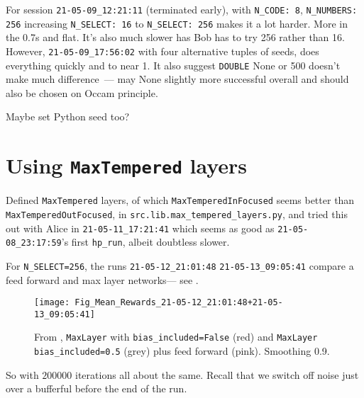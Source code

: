 \documentclass[12pt]{article}
\begin{document}
For session \verb|21-05-09_12:21:11| (terminated early), with \verb|N_CODE: 8|, \verb|N_NUMBERS: 256| increasing \verb|N_SELECT: 16| to \verb|N_SELECT: 256| makes it a lot harder. More in the 0.7s and flat. It's also much slower has Bob has to try 256 rather than 16.  However, \verb|21-05-09_17:56:02| with four alternative tuples of seeds, does everything quickly and to near 1.  It also suggest \verb|DOUBLE| None or 500 doesn't make much difference~--- may None slightly more successful overall and should also be chosen on Occam principle.

Maybe set Python seed too?


\section{Using \texttt{MaxTempered} layers}

Defined \verb|MaxTempered| layers, of which \verb|MaxTemperedInFocused| seems better than \verb|MaxTemperedOutFocused|, in \verb|src.lib.max_tempered_layers.py|, and tried this out with Alice in \verb|21-05-11_17:21:41| which seems as good as \verb|21-05-08_23:17:59|'s first \verb|hp_run|, albeit doubtless slower.

For \verb|N_SELECT=256|, the runs \verb|21-05-12_21:01:48| \verb|21-05-13_09:05:41| compare a feed forward and max layer networks--- see .
\begin{figure}
	\centering
	\texttt{[image: Fig\_Mean\_Rewards\_21-05-12\_21:01:48+21-05-13\_09:05:41]}
	\caption{From , \texttt{MaxLayer} with \texttt{bias\_included=False} (red) and \texttt{MaxLayer} \texttt{bias\_included=0.5} (grey) plus  feed forward (pink).  Smoothing 0.9.}
	\label{fig:figmeanrewards21-05-1221014821-05-13090541}
\end{figure}
So with $\num{200000}$ iterations all about the same.  Recall that we switch off noise just over a bufferful before the end of the run.
\end{document}
